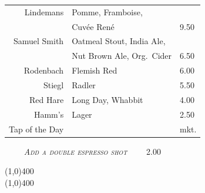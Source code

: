 \documentclass[letterpaper, 12pt]{article}%
\newcommand{\flowtherefore}{~~\raisebox{0.2ex}{$\therefore$}~~}
\newcommand{\price}[2]{
 \textsc{\small#1}\flowtherefore
 \textsc{#2}
}
\newcommand{\varprice}[1]{
 \textsc{#1}
}
\newcommand{\heading}[1]{{\large\bfseries #1\par}}
\newcommand{\flowentry}[1]{
{\centering\heading{\LARGE\textbsi{#1}}\vspace{-2ex}

\line(1,0){400}\vspace{-3ex}\\ 
\line(1,0){400}\vspace{-2ex}

}}
\begin{document}
\begin{minipage}[t][\beerhi][b]{\beerwi}
 \scshape
 \centering
 \begin{tabular}{@{} r l l @{}}
  Lindemans     & Pomme, Framboise,                                             & \\
                & Cuv\'{e}e Ren\'{e}                                            & \varprice{9.50} \\
  Samuel Smith  & Oatmeal Stout, India Ale,                                     & \\
                & Nut Brown Ale, Org.\ Cider                                    & \varprice{6.50} \\
  Rodenbach     & Flemish Red                                                   & \varprice{6.00}\\
  Stiegl        & Radler                                                        & \varprice{5.50}\\
  Red Hare      & Long Day, Whabbit                                             & \varprice{4.00}\\
  Hamm's        & Lager                                                         & \varprice{2.50}\\
  Tap of the Day & & mkt.\\
 \end{tabular}
\end{minipage}

  
\vspace{1.5ex}

{\centering
 \textbf{\textup{\normalsize{}}} \flowtherefore \price{\textrm{\emph{\normalsize Add a double espresso shot}}}{2.00}

}


\flowentry{Go\^{u}ts}

\end{document}
